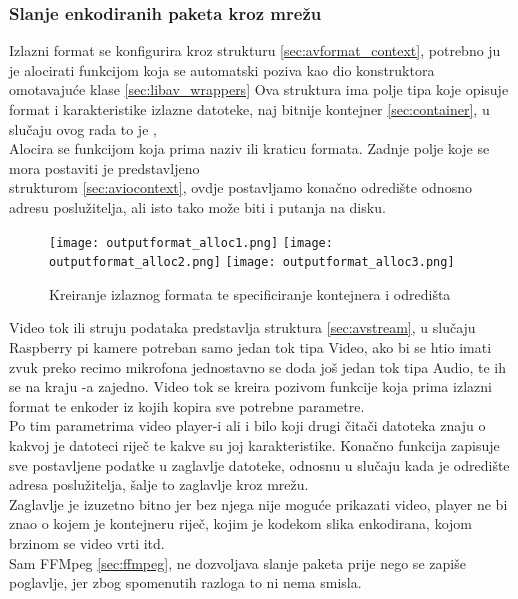 \clearpage
\subsubsection{Slanje enkodiranih paketa kroz mrežu}
Izlazni format se konfigurira kroz strukturu  \ref{sec:avformat_context}, potrebno ju je
alocirati funkcijom  koja se automatski poziva kao dio konstruktora omotavajuće
klase \ref{sec:libav_wrappers}
\paraBreak
Ova struktura ima polje tipa  koje opisuje format i karakteristike izlazne datoteke,
naj bitnije kontejner \ref{sec:container},
u slučaju ovog rada to je ,
\\
Alocira se funkcijom  koja prima naziv ili kraticu formata.
\paraBreak
Zadnje polje koje se mora postaviti je  predstavljeno \\
strukturom  \ref{sec:aviocontext}, ovdje postavljamo konačno odredište odnosno adresu poslužitelja, ali
isto tako može biti i putanja na disku.
\begin{figure}[h]
  \texttt{[image: outputformat\_alloc1.png]}
  \texttt{[image: outputformat\_alloc2.png]}
  \texttt{[image: outputformat\_alloc3.png]}
  \caption[Kreiranje izlaznog formata]{Kreiranje izlaznog formata te specificiranje kontejnera i odredišta}
\end{figure}

\label{sec:output_format_ctx}
Video tok ili struju podataka predstavlja struktura  \ref{sec:avstream}, u slučaju Raspberry pi kamere
potreban samo jedan tok tipa Video, ako bi se htio imati zvuk preko recimo mikrofona jednostavno se doda još jedan tok
tipa Audio, te ih se na kraju -a zajedno.
\paraBreak
Video tok se kreira pozivom funkcije  koja prima izlazni format te enkoder iz kojih
kopira sve potrebne parametre. \\
Po tim parametrima video player-i ali i bilo koji drugi čitači datoteka znaju o kakvoj je datoteci riječ te kakve su joj
karakteristike.
\paraBreak
Konačno funkcija  zapisuje sve postavljene podatke u zaglavlje datoteke, odnosnu u slučaju
kada je odredište adresa poslužitelja, šalje to zaglavlje kroz mrežu. \\
Zaglavlje je izuzetno bitno jer bez njega nije moguće prikazati video, player ne bi znao o kojem je kontejneru riječ, kojim
je kodekom slika enkodirana, kojom brzinom se video vrti itd. \\
Sam FFMpeg \ref{sec:ffmpeg}, ne dozvoljava slanje paketa prije nego se zapiše poglavlje, jer zbog spomenutih razloga to ni
nema smisla. \cite{ffmpegDocs}

